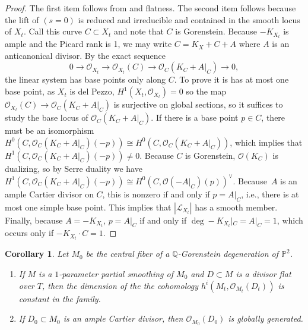 \documentclass[11pt]{article}
\newcommand{\ie}{i.e.,\xspace}
\theoremstyle{plain}
\newtheorem{corollary}[theorem]{Corollary}
\theoremstyle{definition}
\newcommand\PP{{\mathbb{P}}}
\newcommand\QQ{{\mathbb Q}}
\newcommand\Lc{{\mathcal L}}
\newcommand\Oc{{\mathcal O}}
\begin{document}
\begin{proof}
The first item follows from \cite[Prop.\,2.79]{KollarModuliBook} and flatness. The second item follows because the lift of $(s = 0)$ is reduced and irreducible and contained in the smooth locus of $X_t$. Call this curve $C \subset X_t$ and note that $C$ is Gorenstein. Because $-K_{X_t}$ is ample and the Picard rank is 1, we may write $C = K_X + C + A$ where $A$ is an anticanonical divisor. By the exact sequence
\[ 0 \to \Oc_{X_t} \to \Oc_{X_t}(C) \to \Oc_C(K_C+A|_C) \to 0,\]
the linear system has base points only along $C$. To prove it is has at most one base point, as $X_t$ is del Pezzo, $H^1(X_t, \Oc_{X_t}) = 0$ so the map $\Oc_{X_t}(C) \to \Oc_C(K_C+A|_C)$ is surjective on global sections, so it suffices to study the base locus of $\Oc_C(K_C+A|_C)$. If there is a base point $p \in C$, there must be an isomorphism $H^0(C,\Oc_C(K_C+A|_C)(-p)) \cong H^0(C,\Oc_C(K_C+A|_C))$, which implies that $H^1(C,\Oc_C(K_C+A|_C)(-p)) \ne 0$. Because $C$ is Gorenstein, $\Oc(K_C)$ is dualizing, so by Serre duality we have $H^1(C,\Oc_C(K_C+A|_C)(-p)) \cong H^0(C, \Oc(-A|_C)(p))^\vee$. Because~$A$ is an ample Cartier divisor on $C$, this is nonzero if and only if $p = A|_C$, \ie there is at most one simple base point. This implies that $|\Lc_{X_t}|$ has a smooth member. Finally, because $A = -K_{X_t}$, $p = A|_C $ if and only if $\deg -K_{X_t}|_C = A|_C = 1$, which occurs only if $-K_{X_t} \cdot C = 1$.
\end{proof}

\begin{corollary}\label{cor:ampleisbpfformanetti} Let $M_0$ be the central fiber of a $\QQ$-Gorenstein degeneration of $\PP^2$.
\begin{enumerate}
\item\label{cor:ampleisbpfformanetti1} If $M$ is a $1$-parameter partial smoothing of $M_0$ and $D\subset M$ is a divisor flat over $T$, then the dimension of the the cohomology $h^i(M_t,\Oc_{M_t}(D_t))$ is constant in the family.
\item\label{cor:ampleisbpfformanetti2} If $D_0\subset M_0$ is an ample Cartier divisor, then $\Oc_{M_0}(D_0)$ is globally generated.
\end{enumerate}
\end{corollary}\label{globallygenerated}
\end{document}
